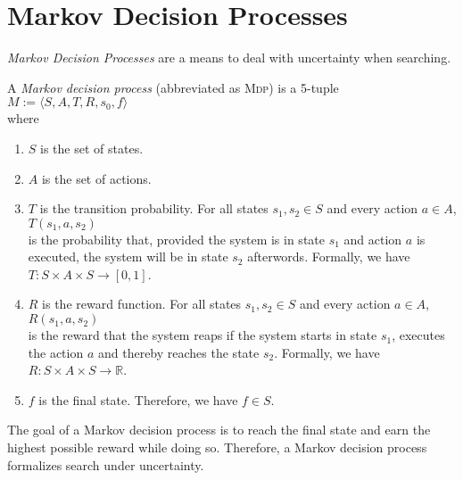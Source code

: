 \chapter{Markov Decision Processes}
\emph{Markov Decision Processes} are a means to deal with uncertainty when searching.

\begin{Definition}
  A \emph{Markov decision process} (abbreviated as \textsc{Mdp}) is a 5-tuple
  \\[0.2cm]
  \hspace*{1.3cm}
  $M := \langle S, A, T, R, s_0, f \rangle$
  \\[0.2cm]
  where 
  \begin{enumerate}
  \item $S$ is the set of states.
  \item $A$ is the set of actions.
  \item $T$ is the transition probability.  For all states $s_1,s_2 \in S$ and every action $a \in A$,
        \\[0.2cm]
        \hspace*{1.3cm}
        $T(s_1,a,s_2)$
        \\[0.2cm]
        is the probability that, provided the system is in state $s_1$ and action $a$ is executed,
        the system will be in state $s_2$ afterwords.  Formally, we have
        \\[0.2cm]
        \hspace*{1.3cm}
        $T:S \times A \times S \rightarrow [0,1]$.
  \item $R$ is the reward function.  For all states $s_1,s_2 \in S$ and every action $a \in A$,
        \\[0.2cm]
        \hspace*{1.3cm}
        $R(s_1,a,s_2)$
        \\[0.2cm]
        is the reward that the system reaps if the system starts in state $s_1$, executes the action
        $a$ and thereby reaches the state $s_2$.  Formally, we have
        \\[0.2cm]
        \hspace*{1.3cm}
        $R:S \times A \times S \rightarrow \mathbb{R}$. 
  \item $f$ is the final state. Therefore, we have $f \in S$.  
  \end{enumerate}
  The goal of a Markov decision process is to reach the final state and earn the highest possible
  reward while doing so.  Therefore, a Markov decision process formalizes search under uncertainty.
\eox
\end{Definition}

